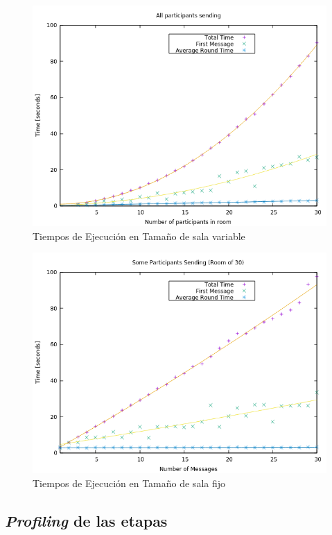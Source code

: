 \begin{figure}[h]
  \centering
    \includegraphics[scale=0.7]{logs/logs_all/times.png}
  \caption{Tiempos de Ejecución en Tamaño de sala variable}
\end{figure}

\begin{figure}[h]
  \centering
    \includegraphics[scale=0.7]{logs/logs_partial_30/times.png}
  \caption{Tiempos de Ejecución en Tamaño de sala fijo}
\end{figure}

\subsection{\emph{Profiling} de las etapas}

